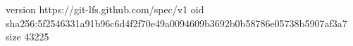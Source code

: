 version https://git-lfs.github.com/spec/v1
oid sha256:5f2546331a91b96c6d4f2f70e49a0094609b3692b0b58786e05738b5907af3a7
size 43225
